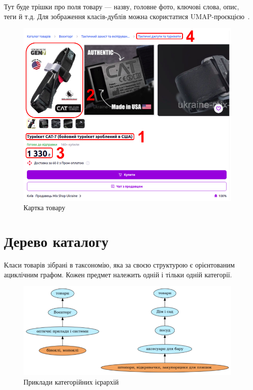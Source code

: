 \documentclass[fleqn,12pt,a4paper]{report}
\numberwithin{equation}{chapter}
\numberwithin{figure}{chapter}
\numberwithin{table}{chapter}
\numberwithin{footnote}{chapter}
\numberwithin{figure}{section}
\begin{document}
    Тут буде трішки про поля товару --- назву, головне фото, ключові слова, опис, теги й т.д.
    Для зображення класів-дублів можна скористатися UMAP-проєкцією~\cite{mcinnes2018umap-software}.

    \noindent
    \begin{figure}[ht]
        \includegraphics[width=\textwidth]{images/catify-product}
        \caption{Картка товару}
    \end{figure}

    \newpage


    \section{Дерево каталогу}\label{sec:section1.3}

    Класи товарів зібрані в таксономію, яка за своєю структурою є орієнтованим ациклічним графом.
    Кожен предмет належить одній і тільки одній категорії.

    \noindent
    \begin{figure}[ht]
        \includegraphics[width=\textwidth]{images/catify-hierarchies}
        \caption{Приклади категорійних ієрархій}
    \end{figure}
\end{document}
